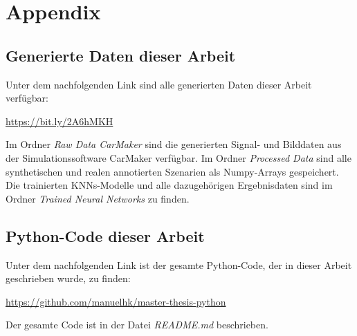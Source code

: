 
\chapter*{Appendix}
\label{appendix}

\begin{flushleft}

\section*{Generierte Daten dieser Arbeit}
\label{appendix_data}

Unter dem nachfolgenden Link sind alle generierten Daten dieser Arbeit verfügbar:

\vspace{0,5cm}
\url{https://bit.ly/2A6hMKH}
\vspace{0,5cm}

Im Ordner \textit{Raw Data CarMaker} sind die generierten Signal- und Bilddaten aus der Simulationssoftware CarMaker verfügbar. Im Ordner \textit{Processed Data} sind alle synthetischen und realen annotierten Szenarien als Numpy-Arrays gespeichert. Die trainierten \acp{KNN}-Modelle und alle dazugehörigen Ergebnisdaten sind im Ordner \textit{Trained Neural Networks} zu finden.


\section*{Python-Code dieser Arbeit}
\label{appendix_code}

Unter dem nachfolgenden Link ist der gesamte Python-Code, der in dieser Arbeit geschrieben wurde, zu finden:

\vspace{0,5cm}
\url{https://github.com/manuelhk/master-thesis-python}
\vspace{0,5cm}

Der gesamte Code ist in der Datei \textit{README.md} beschrieben.

\end{flushleft}
